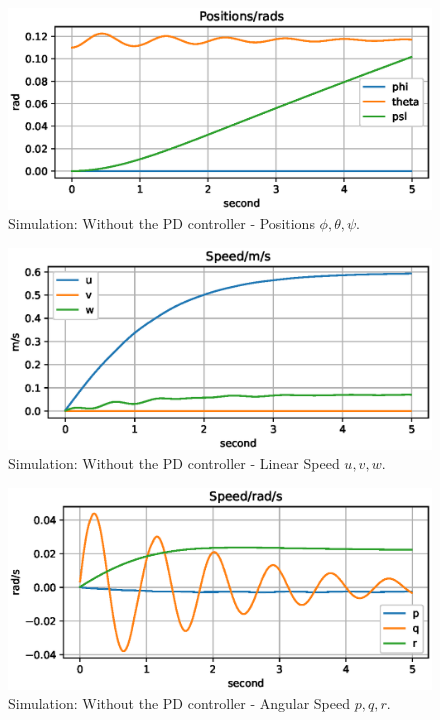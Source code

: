 \begin{figure}[ht]
    \centering
    \includegraphics[width=.8\textwidth]{images/05nopid-test-ptp.eps}
    \caption{Simulation: Without the PD controller - Positions $\phi, \theta, \psi$.}
    \label{fig:05nopid-ptp}
\end{figure}

\begin{figure}[ht]
    \centering
    \includegraphics[width=.8\textwidth]{images/05nopid-test-uvw.eps}
    \caption{Simulation: Without the PD controller - Linear Speed $u, v, w$.}
    \label{fig:05nopid-uvw}
\end{figure}

\begin{figure}[ht]
    \centering
    \includegraphics[width=.8\textwidth]{images/05nopid-test-pqr.eps}
    \caption{Simulation: Without the PD controller - Angular Speed $p, q, r$.}
    \label{fig:05nopid-pqr}
\end{figure}

